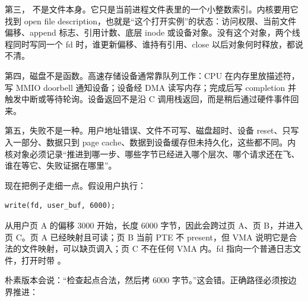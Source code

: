 第三， 不是文件本身。它只是当前进程文件表里的一个小整数索引。内核要用它找到 open file description，也就是“这个打开实例”的状态：访问权限、当前文件偏移、append 标志、引用计数、底层 inode 或设备对象。没有这个对象，两个线程同时写同一个 fd 时，谁更新偏移、谁持有引用、close 以后对象何时释放，都说不清。

第四，磁盘不是函数。高速存储设备通常靠队列工作：CPU 在内存里放描述符，写 MMIO doorbell 通知设备；设备经 DMA 读写内存；完成后写 completion 并触发中断或等待轮询。设备返回不是沿 C 调用栈返回，而是稍后通过硬件事件回来。

第五，失败不是一种。用户地址错误、文件不可写、磁盘超时、设备 reset、只写入一部分、数据只到 page cache、数据到设备缓存但未持久化，这些都不同。内核对象必须记录“推进到哪一步、哪些字节已经进入哪个层次、哪个请求还在飞、谁在等它、失败证据在哪里”。

现在把例子走细一点。假设用户执行：

\begin{lstlisting}
write(fd, user_buf, 6000);
\end{lstlisting}

 从用户页 A 的偏移 3000 开始，长度 6000 字节，因此会跨过页 A、页 B，并进入页 C。页 A 已经映射且可读；页 B 当前 PTE 不 present，但 VMA 说明它是合法的文件映射，可以缺页调入；页 C 不在任何 VMA 内。fd 指向一个普通日志文件，打开时带 。

朴素版本会说：“检查起点合法，然后拷 6000 字节。”这会错。正确路径必须按边界推进：

